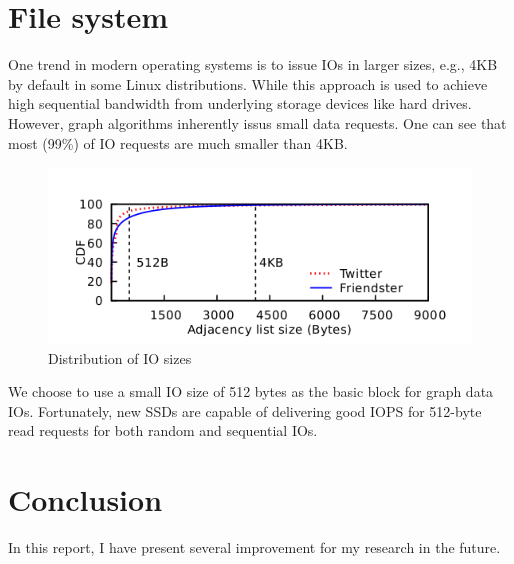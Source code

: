 \section{File system} 
One trend in modern operating systems is to issue IOs in larger sizes, e.g., 4KB by default in some Linux distributions. While this approach is used to achieve high sequential bandwidth from underlying storage devices like hard drives. However, graph algorithms inherently issus small data requests. One can see that most (99\%) of IO requests are much smaller than 4KB. 
\begin{figure}[h]
  \includegraphics[scale = 0.3]{pic/DistribtionIO.png}
  \caption{Distribution of IO sizes}
  \label{fig:iodistribution}
\end{figure}
We choose to use a small IO size of 512 bytes as the basic block for graph data IOs. Fortunately, new SSDs are capable of delivering good IOPS for 512-byte read requests for both random and sequential IOs.

\section{Conclusion}
In this report, I have present several improvement for my research in the future. 



